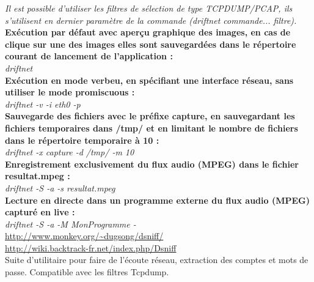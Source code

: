 \documentclass[a4paper,11pt]{article}				    %
\begin{document}
{
\textit{Il est possible d'utiliser les filtres de s\'election de type TCPDUMP/PCAP, ils s'utilisent en dernier param\`etre de la commande (driftnet commande... filtre).}\\

\textbf{Ex\'ecution par d\'efaut avec aper\c cu graphique des images, en cas de clique sur une des images elles sont sauvegard\'ees 
dans le r\'epertoire courant de lancement de l'application :}\\
{\sl \color{blue}driftnet}\\

\textbf{Ex\'ecution en mode verbeu, en sp\'ecifiant une interface r\'eseau, sans utiliser le mode promiscuous :}\\
{\sl \color{blue}driftnet -v -i eth0 -p}\\

\textbf{Sauvegarde des fichiers avec le pr\'efixe capture, en sauvegardant les fichiers temporaires dans /tmp/ et
 en limitant le nombre de fichiers dans le r\'epertoire temporaire \`a 10 : }\\
{\sl \color{blue}driftnet -x capture -d /tmp/ -m 10}\\

\textbf{Enregistrement exclusivement du flux audio (MPEG) dans le fichier resultat.mpeg :}\\
{\sl \color{blue}driftnet -S -a -s resultat.mpeg }\\

\textbf{Lecture en directe dans un programme externe du flux audio (MPEG) captur\'e en live :}\\
{\sl \color{blue}driftnet -S -a -M MonProgramme - }\\
}
{
\url{http://www.monkey.org/~dugsong/dsniff/}\\
\url{http://wiki.backtrack-fr.net/index.php/Dsniff}
}
{
\\Suite d'utilitaire pour faire de l'\'ecoute r\'eseau, extraction des comptes et mots de passe. 
Compatible avec les filtres Tcpdump.
}
\end{document}
